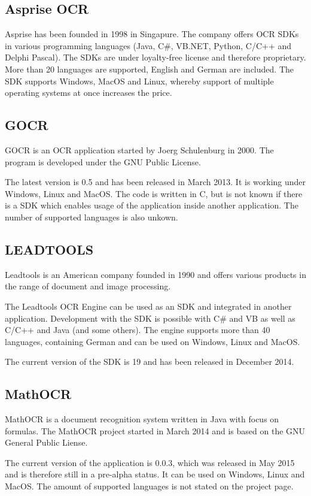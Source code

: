 \label{Asprise}
\subsection{Asprise OCR}
Asprise has been founded in 1998 in Singapure. The company offers OCR SDKs in various programming languages (Java, C\#, VB.NET, Python, C/C++ and Delphi Pascal). The SDKs are under loyalty-free license and therefore proprietary. More than 20 languages are supported, English and German are included.
The SDK supports Windows, MacOS and Linux, whereby support of multiple operating systems at once increases the price.

\label{GOCR}
\subsection{GOCR}
GOCR is an OCR application started by Joerg Schulenburg in 2000. The program is developed under the GNU Public License.

The latest version is 0.5 and has been released in March 2013. It is working under Windows, Linux and MacOS. The code is written in C, but is not known if there is a SDK which enables usage of the application inside another application. The number of supported languages is also unkown.

\label{LEADTOOLS}
\subsection{LEADTOOLS}
Leadtools is an American company founded in 1990 and offers various products in the range of document and image processing. 

The Leadtools OCR Engine can be used as an SDK and integrated in another application. Development with the SDK is possible with C\# and VB as well as C/C++ and Java (and some others). The engine supports more than 40 languages, containing German and can be used on Windows, Linux and MacOS. 

The current version of the SDK is 19 and has been released in December 2014.

\label{MathOCR}
\subsection{MathOCR}
MathOCR is a document recognition system written in Java with focus on formulas. The MathOCR project started in March 2014 and is based on the GNU General Public Liense.

The current version of the application is 0.0.3, which was released in May 2015 and is therefore still in a pre-alpha status. It can be used on Windows, Linux and MacOS. The amount of supported languages is not stated on the project page.

